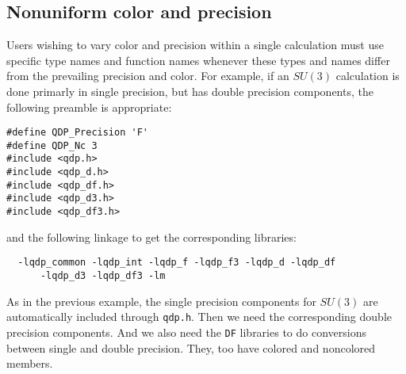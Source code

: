 \documentclass{article}
\begin{document}
\subsection{Nonuniform color and precision}

Users wishing to vary color and precision within a single calculation
must use specific type names and function names whenever these types
and names differ from the prevailing precision and color.  For
example, if an $SU(3)$ calculation is done primarly in single
precision, but has double precision components, the following preamble
is appropriate:
%
\begin{verbatim}
#define QDP_Precision 'F'
#define QDP_Nc 3
#include <qdp.h>
#include <qdp_d.h>
#include <qdp_df.h>
#include <qdp_d3.h>
#include <qdp_df3.h>
\end{verbatim}
%
and the following linkage to get the corresponding libraries:
%
\begin{verbatim}
  -lqdp_common -lqdp_int -lqdp_f -lqdp_f3 -lqdp_d -lqdp_df 
      -lqdp_d3 -lqdp_df3 -lm
\end{verbatim}
%
As in the previous example, the single precision components for
$SU(3)$ are automatically included through {\tt qdp.h}.  Then we need
the corresponding double precision components.  And we also need the
{\tt DF} libraries to do conversions between single and double
precision.  They, too have colored and noncolored members.
\end{document}
